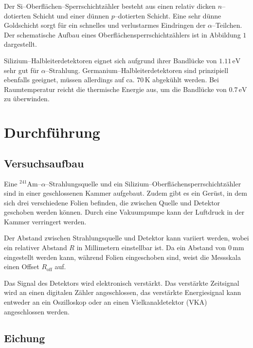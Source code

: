\documentclass[12pt,a4paper]{scrartcl}
\numberwithin{equation}{section} %
\begin{document}
Der $\mathrm{Si}$--Oberflächen--Sperrschichtzähler besteht aus einen relativ dicken $n$--dotierten Schicht und einer dünnen $p$--dotierten Schicht. Eine sehr dünne Goldschicht sorgt für ein schnelles und verlustarmes Eindringen der $\alpha$--Teilchen. Der schematische Aufbau eines Oberflächensperrschichtzählers ist in Abbildung $1$ dargestellt.

Silizium--Halbleiterdetektoren eignet sich aufgrund ihrer Bandlücke von $1.11\mathrm{\,eV}$ sehr gut für $\alpha$--Strahlung. Germanium--Halbleiterdetektoren sind prinzipiell ebenfalls geeignet, müssen allerdings auf ca. $70\,\mathrm K$ abgekühlt werden. Bei Raumtemperatur reicht die thermische Energie aus, um die Bandlücke von $0.7\mathrm{\,eV}$ zu überwinden. \cite{Knoll}

\hypertarget{durchfuxfchrung}{%
\section{Durchführung}\label{durchfuxfchrung}}

\hypertarget{versuchsaufbau}{%
\subsection{Versuchsaufbau}\label{versuchsaufbau}}

Eine $^{241}\mathrm{Am}$--$\alpha$--Strahlungsquelle und ein Silizium--Oberflächensperrschichtzähler sind in einer geschlossenen Kammer aufgebaut. Zudem gibt es ein Gerüst, in dem sich drei verschiedene Folien befinden, die zwischen Quelle und Detektor geschoben werden können. Durch eine Vakuumpumpe kann der Luftdruck in der Kammer verringert werden.

Der Abstand zwischen Strahlungsquelle und Detektor kann variiert werden, wobei ein relativer Abstand $R$ in Millimetern einstellbar ist. Da ein Abstand von $0\mathrm{\,mm}$ eingestellt werden kann, während Folien eingeschoben sind, weist die Messskala einen Offset $R_\mathrm{off}$ auf.

Das Signal des Detektors wird elektronisch verstärkt. Das verstärkte Zeitsignal wird an einen digitalen Zähler angeschlossen, das verstärkte Energiesignal kann entweder an ein Oszilloskop oder an einen Vielkanaldetektor (VKA) angeschlossen werden.

\hypertarget{eichung}{%
\subsection{Eichung}\label{eichung}}
\end{document}
